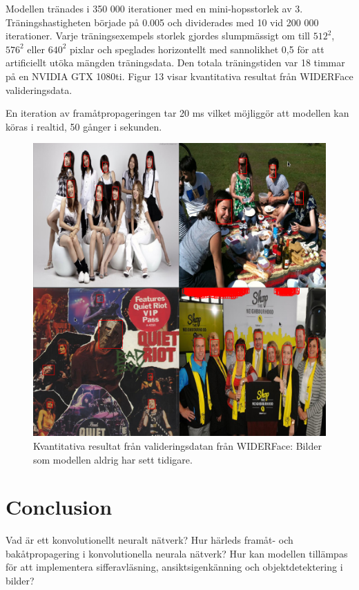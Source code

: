 \documentclass[a4paper,11pt,twoside]{article}
\begin{document}
Modellen tränades i 350 000 iterationer med en mini-hopsstorlek av 3. Träningshastigheten började på 0.005 och dividerades med 10 vid 200 000 iterationer. Varje träningsexempels storlek gjordes slumpmässigt om till $512^2$, $576^2$ eller $640^2$ pixlar och speglades horizontellt med sannolikhet 0,5 för att artificiellt utöka mängden träningsdata. Den totala träningstiden var 18 timmar på en NVIDIA GTX 1080ti. Figur 13 visar kvantitativa resultat från WIDERFace valideringsdata.

En iteration av framåtpropageringen tar 20 ms vilket möjliggör att modellen kan köras i realtid, 50 gånger i sekunden.

\begin{figure}[h]\label{results1}
	\centering
  		\includegraphics[scale=0.42]{results1.png}
  	\caption{Kvantitativa resultat från valideringsdatan från WIDERFace: Bilder som modellen aldrig har sett tidigare.}
\end{figure}

\section{Conclusion}
Vad är ett konvolutionellt neuralt nätverk?
Hur härleds framåt- och bakåtpropagering i konvolutionella neurala nätverk?
Hur kan modellen tillämpas för att implementera sifferavläsning, ansiktsigenkänning och objektdetektering i bilder?
\end{document}
